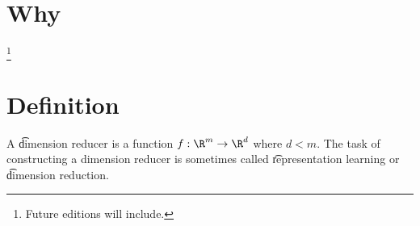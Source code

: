 

\section*{Why}
\footnote{Future editions will include.}
\section*{Definition}

A \t{dimension reducer} is a function $f: \R ^m \to \R ^d$ where $d < m$.
The task of constructing a dimension reducer is sometimes called \t{representation learning} or \t{dimension reduction}.

\blankpage